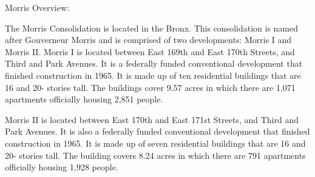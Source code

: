 Morris Overview:     

   

The Morris Consolidation is located in the Bronx. This consolidation is named after Gouverneur Morris and is comprised of two developments: Morris I and Morris II. Morris I is located between East 169th and East 170th Streets, and Third and Park Avenues. It is a federally funded conventional development that finished construction in 1965. It is made up of ten residential buildings that are 16 and 20- stories tall. The buildings cover 9.57 acres in which there are 1,071 apartments officially housing 2,851 people. 



Morris II is located between East 170th and East 171st Streets, and Third and Park Avenues. It is also a federally funded conventional development that finished construction in 1965.  It is made up of seven residential buildings that are 16 and 20- stories tall. The building covers 8.24 acres in which there are 791 apartments officially housing 1,928 people.